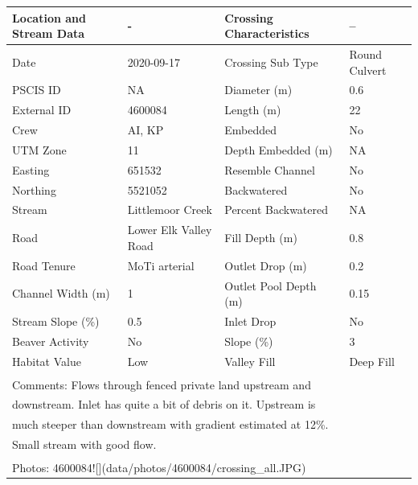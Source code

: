 \documentclass[
]{book}
\begin{document}
\begin{tabular}{l|l|l|l}
\hline
Location and Stream Data & - & Crossing Characteristics & --\\
\hline
Date & 2020-09-17 & Crossing Sub Type & Round Culvert\\
\hline
PSCIS ID & NA & Diameter (m) & 0.6\\
\hline
External ID & 4600084 & Length (m) & 22\\
\hline
Crew & AI, KP & Embedded & No\\
\hline
UTM Zone & 11 & Depth Embedded (m) & NA\\
\hline
Easting & 651532 & Resemble Channel & No\\
\hline
Northing & 5521052 & Backwatered & No\\
\hline
Stream & Littlemoor Creek & Percent Backwatered & NA\\
\hline
Road & Lower Elk Valley Road & Fill Depth (m) & 0.8\\
\hline
Road Tenure & MoTi arterial & Outlet Drop (m) & 0.2\\
\hline
Channel Width (m) & 1 & Outlet Pool Depth (m) & 0.15\\
\hline
Stream Slope (\%) & 0.5 & Inlet Drop & No\\
\hline
Beaver Activity & No & Slope (\%) & 3\\
\hline
Habitat Value & Low & Valley Fill & Deep Fill\\
\hline
\multicolumn{4}{l}{\textsuperscript{} Comments: Flows through fenced private land upstream and}\\
\multicolumn{4}{l}{downstream. Inlet has quite a bit of debris on it. Upstream is}\\
\multicolumn{4}{l}{much steeper than downstream with gradient estimated at 12\%.}\\
\multicolumn{4}{l}{Small stream with good flow.}\\
\multicolumn{4}{l}{\textsuperscript{} Photos: 4600084![](data/photos/4600084/crossing\_all.JPG)}\\
\end{tabular}
\end{document}

